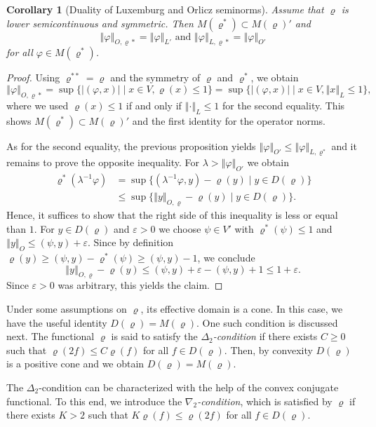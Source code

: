 \documentclass[a4paper,11pt,reqno]{amsart}
\newtheorem{corollary}[lemma]{Corollary}
\theoremstyle{definition}
\numberwithin{equation}{section}
\newcommand{\vr}{{\varrho}}
\newcommand{\av}[1]{\left\Vert #1\right\Vert}
\newcommand{\1}{\mathds{1}}
\begin{document}
  
  \begin{corollary}[Duality of Luxemburg and Orlicz seminorms] \label{coro:dual spaces}
   Assume that $\vr$ is lower semicontinuous and symmetric. Then $M(\vr^*) \subset M(\vr)'$ and 
   $$\av{\varphi}_{O,\vr*} = \av{\varphi}_{L'}  \text{ and }\av{\varphi}_{L,\vr*} = \av{\varphi}_{O'} $$
   for all $\varphi \in M(\vr^*)$.
  \end{corollary}
 \begin{proof}
  Using $\vr^{**} = \vr$ and the symmetry of $\vr$ and $\vr^*$, we obtain 
  $$\av{\varphi}_{O,\vr*} = \sup \{|(\varphi,x)| \mid x \in V, \vr(x) \leq 1\} = \sup \{|(\varphi,x)| \mid x \in V, \av{x}_L \leq 1\},$$
  where we used $\vr(x) \leq 1$ if and only if $\av{\cdot}_L \leq 1$ for the second equality. This shows $M(\vr^*) \subset M(\vr)'$ and the first identity for the operator norms. 
  
 As for the second equality, the previous proposition yields $\av{\varphi}_{O'} \leq \av{\varphi}_{L,\vr^*}$ and  it remains to prove the opposite inequality.  For $\lambda  > \av{\varphi}_{O'}$ we obtain  
 \begin{align*}
\vr^*(\lambda^{-1} \varphi) &= \sup \{ (\lambda^{-1} \varphi,y) - \vr(y) \mid y \in D(\vr)\}   \\
&\leq \sup \{\av{y}_{O,\vr}  - \vr(y) \mid y \in D(\vr)\}.
 \end{align*}
 Hence, it suffices to show that the right side of this inequality is less or equal than $1$.  For $y \in D(\vr)$ and $\varepsilon > 0$ we choose $\psi \in V'$ with $\vr^*(\psi) \leq 1$ and $\av{y}_O \leq (\psi,y) + \varepsilon$. Since by definition $\vr(y) \geq (\psi,y) - \vr^*(\psi) \geq (\psi,y) - 1$, we conclude 
 $$\av{y}_{O,\vr} - \vr(y) \leq (\psi,y) + \varepsilon - (\psi,y) + 1 \leq 1 + \varepsilon. $$
 Since $\varepsilon > 0$ was arbitrary, this yields the claim.   
 \end{proof}

 Under some assumptions on $\vr$, its effective domain is a cone. In this case, we have the useful identity $D(\vr) = M(\vr)$.   One such condition is discussed next.  The functional $\vr$ is said to satisfy the {\em $\Delta_2$-condition} if there exists $C \geq 0$ such that $\vr(2f) \leq C \vr(f)$ for all $f \in D(\vr)$. Then, by convexity $D(\vr)$ is a positive cone and we obtain $D(\vr) = M(\vr)$. 
 
 The $\Delta_2$-condition can be characterized with the help of the convex conjugate functional. To this end, we introduce the {\em $\nabla_2$-condition}, which is satisfied by $\vr$ if there exists $K > 2$ such that $K \vr(f) \leq \vr(2f)$ for all $f \in D(\vr)$. 
 
\end{document}
